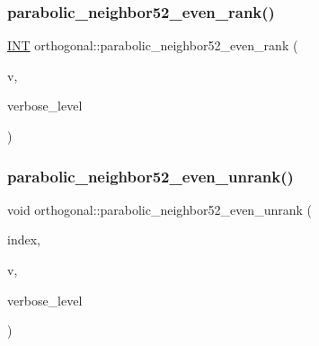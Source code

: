 \subsubsection{\texorpdfstring{parabolic\+\_\+neighbor52\+\_\+even\+\_\+rank()}{parabolic\_neighbor52\_even\_rank()}}
{\footnotesize\ttfamily \mbox{\hyperlink{galois_8h_a09fddde158a3a20bd2dcadb609de11dc}{I\+NT}} orthogonal\+::parabolic\+\_\+neighbor52\+\_\+even\+\_\+rank (\begin{DoxyParamCaption}\item[{\mbox{\hyperlink{galois_8h_a09fddde158a3a20bd2dcadb609de11dc}{I\+NT}} $\ast$}]{v,  }\item[{\mbox{\hyperlink{galois_8h_a09fddde158a3a20bd2dcadb609de11dc}{I\+NT}}}]{verbose\+\_\+level }\end{DoxyParamCaption})}

\mbox{\label{classorthogonal_a3d73df62e2289e2e0728d93af3115e5b}} 
\subsubsection{\texorpdfstring{parabolic\+\_\+neighbor52\+\_\+even\+\_\+unrank()}{parabolic\_neighbor52\_even\_unrank()}}
{\footnotesize\ttfamily void orthogonal\+::parabolic\+\_\+neighbor52\+\_\+even\+\_\+unrank (\begin{DoxyParamCaption}\item[{\mbox{\hyperlink{galois_8h_a09fddde158a3a20bd2dcadb609de11dc}{I\+NT}}}]{index,  }\item[{\mbox{\hyperlink{galois_8h_a09fddde158a3a20bd2dcadb609de11dc}{I\+NT}} $\ast$}]{v,  }\item[{\mbox{\hyperlink{galois_8h_a09fddde158a3a20bd2dcadb609de11dc}{I\+NT}}}]{verbose\+\_\+level }\end{DoxyParamCaption})}

\mbox{\label{classorthogonal_a8c2cac0e686f8c0dcb6a93a37c447970}} 
